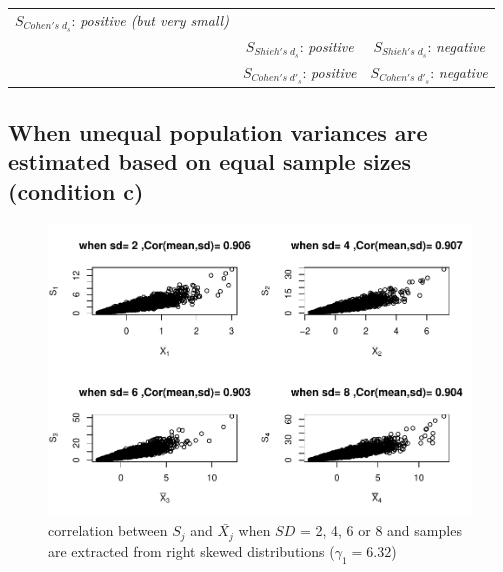 \documentclass[
  man]{apa6}
\begin{document}
\begin{longtable}[]{@{}lcc@{}}
\begin{minipage}[t]{0.35\columnwidth}
\(S_{Cohen's \; d_s}\): \emph{positive (but very small)}\strut
\end{minipage}\tabularnewline
\begin{minipage}[t]{0.27\columnwidth}\raggedright
\strut
\end{minipage} & \begin{minipage}[t]{0.29\columnwidth}\centering
\(S_{Shieh's \; d_s}\): \emph{positive}\strut
\end{minipage} & \begin{minipage}[t]{0.35\columnwidth}\centering
\(S_{Shieh's \; d_s}\): \emph{negative}\strut
\end{minipage}\tabularnewline
\begin{minipage}[t]{0.27\columnwidth}\raggedright
\strut
\end{minipage} & \begin{minipage}[t]{0.29\columnwidth}\centering
\(S_{Cohen's \; d'_s}\): \emph{positive}\strut
\end{minipage} & \begin{minipage}[t]{0.35\columnwidth}\centering
\(S_{Cohen's \; d'_s}\): \emph{negative}\strut
\end{minipage}\tabularnewline
\bottomrule
\end{longtable}

\hypertarget{when-unequal-population-variances-are-estimated-based-on-equal-sample-sizes-condition-c}{%
\subsection{When unequal population variances are estimated based on equal sample sizes (condition c)}\label{when-unequal-population-variances-are-estimated-based-on-equal-sample-sizes-condition-c}}

\begin{figure}
\centering
\includegraphics{Correlation_files/figure-latex/Hetbalcorasafctofn1-1.pdf}
\caption{\label{fig:Hetbalcorasafctofn1}correlation between \(S_j\) and \(\bar{X_j}\) when \(SD\) = 2, 4, 6 or 8 and samples are extracted from right skewed distributions (\(\gamma_1 = 6.32\))}
\end{figure}
\end{document}
